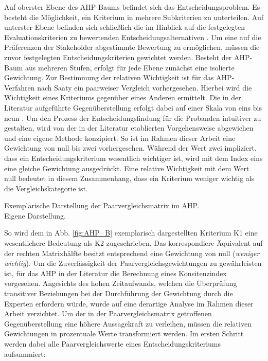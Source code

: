 Auf oberster Ebene des AHP-Baums befindet sich das Entscheidungsproblem. Es besteht die Möglichkeit, ein Kriterium in mehrere Subkriterien zu unterteilen. Auf unterster Ebene befinden sich schließlich die im Hinblick auf die festgelegten Evaluationskriterien zu bewertenden Entscheidungsalternativen \cite[86]{Saaty.2008}. Um eine auf die Präferenzen der Stakeholder abgestimmte Bewertung zu ermöglichen, müssen die zuvor festgelegten Entscheidungskriterien gewichtet werden. Besteht der AHP-Baum aus mehreren Stufen, erfolgt für jede Ebene zunächst eine isolierte Gewichtung. Zur Bestimmung der relativen Wichtigkeit ist für das AHP-Verfahren nach Saaty ein paarweiser Vergleich vorhergesehen. Hierbei wird die Wichtigkeit eines Kriteriums gegenüber eines Anderen ermittelt. Die in der Literatur aufgeführte Gegenüberstellung erfolgt dabei auf einer Skala von eins bis neun \cite[86]{Saaty.2008}. Um den Prozess der Entscheidungsfindung für die Probanden intuitiver zu gestalten, wird von der in der Literatur etablierten Vorgehensweise abgewichen und eine eigene Methode konzipiert. So ist im Rahmen dieser Arbeit eine Gewichtung von null bis zwei vorhergesehen. Während der Wert zwei impliziert, dass ein Entscheidungskriterium wesentlich wichtiger ist, wird mit dem Index eins eine gleiche Gewichtung ausgedrückt. Eine relative Wichtigkeit mit dem Wert null bedeutet in diesem Zusammenhang, dass ein Kriterium weniger wichtig als die Vergleichskategorie ist.  
\begin{center}
	\begin{table}[H]
		\centering
		\caption[Exemplarische Darstellung der Paarvergleichsmatrix im AHP]{Exemplarische Darstellung der Paarvergleichsmatrix im AHP.\\ Eigene Darstellung.}
		\label{fig:AHP_B}
	\end{table}
\end{center}
\vspace*{-15mm}
So wird dem in Abb. \ref{fig:AHP_B} exemplarisch dargestellten Kriterium K1 eine wesentlichere Bedeutung als K2 zugeschrieben. Das korrespondiere Äquivalent auf der rechten Matrixhälfte besitzt entsprechend eine Gewichtung von null (\textit{weniger wichtig}). Um die Zuverlässigkeit der Paarvergleichsgewichtungen zu gewährleisten ist, für das AHP in der Literatur die Berechnung eines Konsitenzindex vorgesehen. Angesichts des hohen Zeitaufwands, welchen die Überprüfung transitiver Beziehungen bei der Durchführung der Gewichtung durch die Experten erfordern würde, wurde auf eine derartige Analyse im Rahmen dieser Arbeit verzichtet. Um der in der Paarvergleichsmatrix getroffenen Gegenüberstellung eine höhere Aussagekraft zu verleihen, müssen die relativen Gewichtungen in prozentuale Werte transformiert werden. Im ersten Schritt werden dabei alle Paarvergleichswerte eines Entscheidungskriteriums aufsummiert:\\
